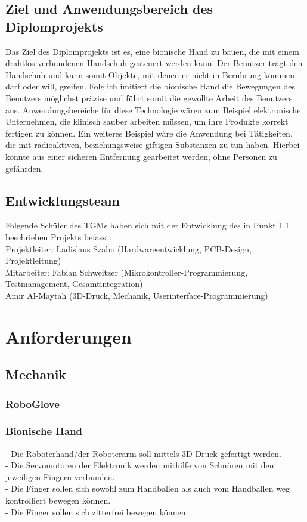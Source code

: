 \documentclass[11pt]{article}
\begin{document}
\subsection{Ziel und Anwendungsbereich des Diplomprojekts}
Das Ziel des Diplomprojekts ist es, eine bionische Hand zu bauen, die mit einem drahtlos verbundenen Handschuh 
gesteuert werden kann. Der Benutzer trägt den Handschuh und kann somit Objekte, mit denen er nicht in Berührung 
kommen darf oder will, greifen. Folglich imitiert die bionische Hand die Bewegungen des Benutzers möglichst präzise 
und führt somit die gewollte Arbeit des Benutzers aus. Anwendungsbereiche für diese Technologie wären zum Beispiel 
elektronische Unternehmen, die klinisch sauber arbeiten müssen, um ihre Produkte korrekt fertigen zu können. Ein 
weiteres Beispiel wäre die Anwendung bei Tätigkeiten, die mit radioaktiven, beziehungsweise giftigen Substanzen zu 
tun haben. Hierbei könnte aus einer sicheren Entfernung gearbeitet werden, ohne Personen zu gefährden.

\subsection{Entwicklungsteam}
Folgende Schüler des TGMs haben sich mit der Entwicklung des in Punkt 1.1 beschrieben Projekts befasst: \hfill \break
\\
Projektleiter:    Ladislaus Szabo (Hardwareentwicklung, PCB-Design, Projektleitung)\\
Mitarbeiter: Fabian Schweitzer (Mikrokontroller-Programmierung, Testmanagement, Gesamtintegration)\\
Amir Al-Maytah (3D-Druck, Mechanik, Userinterface-Programmierung)
\section{Anforderungen}

\subsection{Mechanik}
\subsubsection{RoboGlove}
\subsubsection{Bionische Hand}
-	Die Roboterhand/der Roboterarm soll mittels 3D-Druck gefertigt werden.\\
-	Die Servomotoren der Elektronik werden mithilfe von Schnüren mit den jeweiligen Fingern verbunden.\\
-	Die Finger sollen sich sowohl zum Handballen als auch vom Handballen weg kontrolliert bewegen können.\\
-	Die Finger sollen sich zitterfrei bewegen können.
\end{document}
